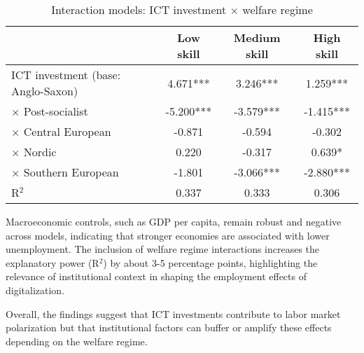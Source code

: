 \begin{table}[H]
\centering
\caption{Interaction models: ICT investment $\times$ welfare regime}
\label{tab:models_interaction}
\begin{tabular}{lccc}
\toprule
 & Low skill & Medium skill & High skill \\
\midrule
ICT investment (base: Anglo-Saxon) & 4.671*** & 3.246*** & 1.259*** \\
$\times$ Post-socialist & -5.200*** & -3.579*** & -1.415*** \\
$\times$ Central European & -0.871 & -0.594 & -0.302 \\
$\times$ Nordic & 0.220 & -0.317 & 0.639* \\
$\times$ Southern European & -1.801 & -3.066*** & -2.880*** \\
R$^2$ & 0.337 & 0.333 & 0.306 \\
\bottomrule
\end{tabular}
\end{table}

Macroeconomic controls, such as GDP per capita, remain robust and negative across models, indicating 
that stronger economies are associated with lower unemployment. The inclusion of welfare regime 
interactions increases the explanatory power (R$^2$) by about 3-5 percentage points, highlighting 
the relevance of institutional context in shaping the employment effects of digitalization.

Overall, the findings suggest that ICT investments contribute to labor market polarization but that 
institutional factors can buffer or amplify these effects depending on the welfare regime.

